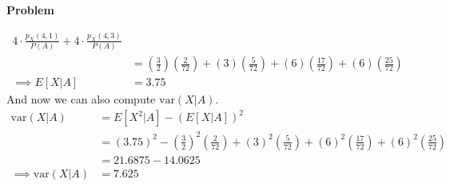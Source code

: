 \documentclass[12pt]{article}
\newenvironment{Ex}{\textbf{Problem}\vspace{.75em}\\}{}
\begin{document}
\begin{enumerate}
\begin{Ex}
\begin{solution}
\begin{enumerate}
\begin{equation}
\begin{aligned}
              4\cdot\frac{p_X(4,1)}{P(A)} +
              4\cdot\frac{p_X(4,3)}{P(A)} \\
              &= \left(\frac{3}{2}\right)\left(\frac{2}{72}\right) +
              (3)\left(\frac{5}{72}\right) +
              (6)\left(\frac{17}{72}\right) + 
              (6)\left(\frac{25}{72}\right) \\
              \implies E[X|A] &= 3.75
            \end{aligned}
          \end{equation}
          And now we can also compute $\text{var}(X|A)$.
          \begin{equation}
            \label{eq:2g-var-x-given-a}
            \begin{aligned}
              \text{var}(X|A) &= E[X^2|A] - (E[X|A])^2 \\
              &= (3.75)^2 -
              \left(\frac{3}{2}\right)^2\left(\frac{2}{72}\right) +
              (3)^2\left(\frac{5}{72}\right) +
              (6)^2\left(\frac{17}{72}\right) +
              (6)^2\left(\frac{25}{72}\right) \\
              &= 21.6875 - 14.0625 \\
              \implies \text{var}(X|A) &= 7.625 \\
            \end{aligned}
          \end{equation}


\end{enumerate}
\end{solution}
\end{Ex}
\end{enumerate}
\end{document}
